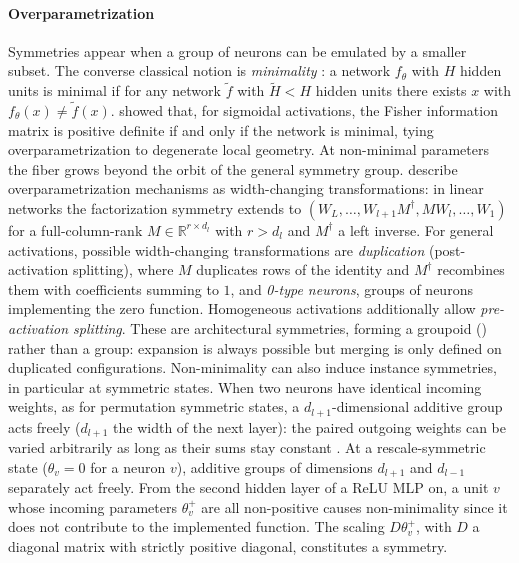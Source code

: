\documentclass[mathematics,review,submit,moreauthors]{Definitions/mdpi}
\begin{document}
\paragraph{Overparametrization}
Symmetries appear when a group of neurons can be emulated by a smaller subset.
The converse classical notion is \emph{minimality} \citep{sussmann1992nn,fukumizu1996nn,brea2019,simsek2021,grillo2026,gegenfurtner2026}: a network $f_\theta$ with $H$ hidden units is minimal if for any network $\tilde f$ with $\tilde{H}<H$ hidden units there exists $x$ with $f_\theta(x)\neq \tilde f(x)$.
\citet{fukumizu1996nn} showed that, for sigmoidal activations, the Fisher information matrix is positive definite if and only if the network is minimal, tying overparametrization to degenerate local geometry.
At non-minimal parameters the fiber grows beyond the orbit of the general symmetry group.
\citet{sareen2026} describe overparametrization mechanisms as width-changing transformations: in linear networks the factorization symmetry extends to $(W_L,\dots,W_{l+1}M^{\dagger},MW_l,\dots,W_1)$ for a full-column-rank $M\in\mathbb{R}^{r\times d_l}$ with $r>d_l$ and $M^{\dagger}$ a left inverse.
For general activations, possible width-changing transformations are \emph{duplication} (post-activation splitting), where $M$ duplicates rows of the identity and $M^{\dagger}$ recombines them with coefficients summing to $1$, and \emph{0-type neurons}, groups of neurons implementing the zero function.
Homogeneous activations additionally allow \emph{pre-activation splitting}.
These are architectural symmetries, forming a groupoid () rather than a group: expansion is always possible but merging is only defined on duplicated configurations.
Non-minimality can also induce instance symmetries, in particular at symmetric states.
When two neurons have identical incoming weights, as for permutation symmetric states, a $d_{l+1}$-dimensional additive group acts freely ($d_{l+1}$ the width of the next layer): the paired outgoing weights can be varied arbitrarily as long as their sums stay constant \citep{brea2019}.
At a rescale-symmetric state ($\theta_v=0$ for a neuron $v$), additive groups of dimensions $d_{l+1}$ and $d_{l-1}$ separately act freely.
From the second hidden layer of a ReLU MLP on, a unit $v$ whose incoming parameters $\theta^+_v$ are all non-positive causes non-minimality since it does not contribute to the implemented function.
The scaling $D\theta^+_v$, with $D$ a diagonal matrix with strictly positive diagonal, constitutes a symmetry.
\end{document}
